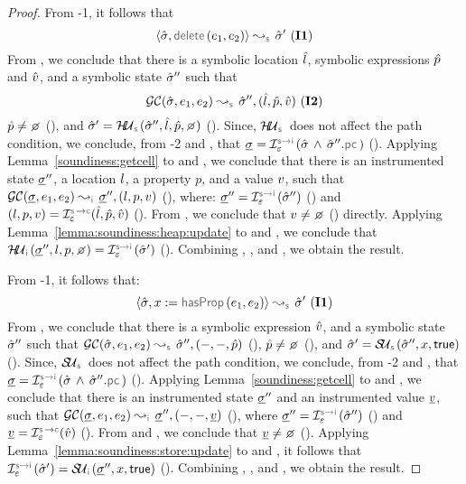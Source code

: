 \begin{proof}
\noindent {}
From \hyp{1}, it follows that 
$$\absbsemrule{\sstate, \jsildelete(\jsilexpr_1, \jsilexpr_2)}{\sstate'}{\symbolic} \text{ (\ieq{1})}$$
From , we conclude that there is a symbolic location $\hat{l}$, symbolic expressions $\hat{p}$ and $\hat{v}$, and a symbolic state $\hat{\sigma}''$ such that 
$$\absgetcellrule{\symbolic}{\sstate, \jsilexpr_1, \jsilexpr_2}{\sstate'', (\sloc, \sexprp, \sexprv)} \text{ (\ieq{2})}$$ 
$\sexprp \neq \none$ (), and  
$\sstate' = \hpupdt{\symbolic}(\sstate'', \sloc, \sexprp, \none)$ (). 
Since, $\hpupdt{\symbolic}$ does not affect the path condition, we conclude, from \hyp{2} and , that
$\istate = \interpret{\symbinst}{\senv}(\sstate \, \wedge \, \sstate''.\pcsel)$ (). 
Applying Lemma~\ref{soundiness:getcell} to  and , we conclude that
there is an instrumented state $\underline{\sigma}''$, a location $l$, a property $p$, and a value $v$, such that 
$\absgetcellrule{\instrumented}{\istate, \jsilexpr_1, \jsilexpr_2}{\istate'', (\loc, p, \val)}$ (), 
where: $\istate'' = \interpret{\symbinst}{\senv}(\sstate'')$ () and 
 $(\loc, p, \val) = \interpret{\symbconc}{\senv}(\sloc, \sexprp, \sexprv)$ (). 
From , we conclude that $\val \neq \none$ () directly. 
Applying Lemma~\ref{lemma:soundiness:heap:update} to  and , we conclude that 
$ \hpupdt{\instrumented}(\istate'', \loc, p, \none) = \interpret{\symbinst}{\senv}(\sstate')$ (). 
Combining , , and , we obtain the result. 
\vspace{5pt} 

\noindent {}
From \hyp{1}, it follows that:
$$\absbsemrule{\sstate, \jvar := \hasfield(\jsilexpr_1, \jsilexpr_2)}{\sstate'}{\symbolic} \text{ (\ieq{1})}$$ 
From , we conclude that there is a symbolic expression $\hat{v}$, and a symbolic state $\hat{\sigma}''$ such that 
$\absgetcellrule{\symbolic}{\sstate, \jsilexpr_1, \jsilexpr_2}{\sstate'', (-, -, \sexprp)}$ (), $\sexprp \neq \none$ (), 
and $\sstate' = \stupdt{\symbolic}(\sstate'', \jvar, \jtrue)$ (). 
Since, $\stupdt{\symbolic}$ does not affect the path condition, we conclude, from \hyp{2} and , that
$\istate = \interpret{\symbinst}{\senv}(\sstate \, \wedge \, \sstate''.\pcsel)$ ().
Applying Lemma~\ref{soundiness:getcell} to  and , we conclude that
there is an instrumented state $\underline{\sigma}''$ and an instrumented value $\underline{v}$, such that 
$\absgetcellrule{\instrumented}{\istate, \jsilexpr_1, \jsilexpr_2}{\istate'', (-, -, \ival)}$ (), 
where $\istate'' = \interpret{\symbinst}{\senv}(\sstate'')$ () and $\ival = \interpret{\symbconc}{\senv}(\sexprv)$ (). 
From  and , we conclude that $\ival \neq \none$ (). 
Applying Lemma~\ref{lemma:soundiness:store:update} to  and , it follows
that  $\interpret{\symbinst}{\senv}(\sstate') = \stupdt{\instrumented}(\istate'', \jvar, \jtrue)$ ().
Combining , , and , we obtain the result. 
\vspace{5pt} 


\end{proof}
